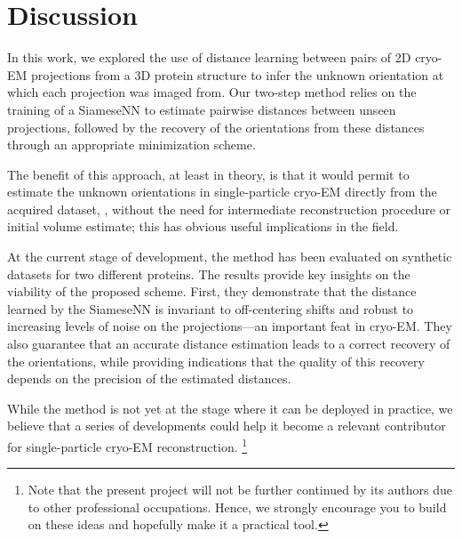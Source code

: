 \section{Discussion}\label{sec:discussion}

In this work, we explored the use of distance learning between pairs of 2D cryo-EM projections from a 3D protein structure to infer the unknown orientation at which each projection was imaged from.
Our two-step method relies on the training of a SiameseNN to estimate pairwise distances between unseen projections, followed by the recovery of the orientations from these distances through an appropriate minimization scheme.

The benefit of this approach, at least in theory, is that it would permit to estimate the unknown orientations in single-particle cryo-EM directly from the acquired dataset, \ie, without the need for intermediate reconstruction procedure or initial volume estimate; this has obvious useful implications in the field.

At the current stage of development, the method has been evaluated on synthetic datasets for two different proteins.
The results provide key insights on the viability of the proposed scheme.
First, they demonstrate that the distance learned by the SiameseNN is invariant to off-centering shifts and robust to increasing levels of noise on the projections---an important feat in cryo-EM\@.
They also guarantee that an accurate distance estimation leads to a correct recovery of the orientations, while providing indications that the quality of this recovery depends on the precision of the estimated distances.

While the method is not yet at the stage where it can be deployed in practice, we believe that a series of developments could help it become a relevant contributor for single-particle cryo-EM reconstruction.%
\footnote{Note that the present project will not be further continued by its authors due to other professional occupations. Hence, we strongly encourage you to build on these ideas and hopefully make it a practical tool.}

